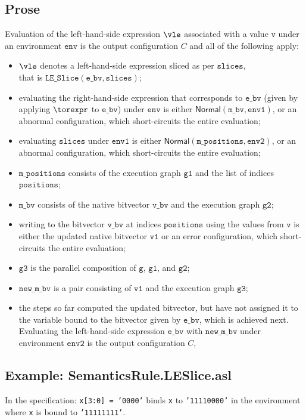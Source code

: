 \documentclass{book}
\newcommand\ProseOrAbnormal[0]{or an abnormal configuration, which short-circuits the entire evaluation}
\newcommand\ProseOrError[0]{or an error configuration, which short-circuits the entire evaluation}
\newcommand\Normal[0]{\textsf{Normal}}
\newcommand\env[0]{\texttt{env}}
\newcommand\envone[0]{\texttt{env1}}
\newcommand\envtwo[0]{\texttt{env2}}
\newcommand\vg[0]{\texttt{g}}
\newcommand\vv[0]{\texttt{v}}
\newcommand\vvone[0]{\texttt{v1}}
\newcommand\vgone[0]{\texttt{g1}}
\newcommand\vgtwo[0]{\texttt{g2}}
\newcommand\vgthree[0]{\texttt{g3}}
\newcommand\ebv[0]{\texttt{e\_bv}}
\newcommand\mbv[0]{\texttt{m\_bv}}
\newcommand\vbv[0]{\texttt{v\_bv}}
\newcommand\mpositions[0]{\texttt{m\_positions}}
\newcommand\slices[0]{\texttt{slices}}
\newcommand\positions[0]{\texttt{positions}}
\newcommand\newmbv[0]{\texttt{new\_m\_bv}}
\begin{document}
  \subsection{Prose}
  Evaluation of the left-hand-side expression $\vle$ associated with a
  value $\vv$ under an environment $\env$ is the output configuration $C$
  and all of the following apply:
  \begin{itemize}
    \item $\vle$ denotes a left-hand-side expression sliced as per $\slices$, \\
    that is $\texttt{LE\_Slice}(\ebv, \slices)$;
    \item evaluating the right-hand-side expression that corresponds to $\ebv$
    (given by applying $\torexpr$ to $\ebv$) under $\env$
      is either $\Normal(\mbv,\envone)$, \ProseOrAbnormal;
    \item evaluating $\slices$ under $\envone$ is either $\Normal(\mpositions, \envtwo)$,
    \ProseOrAbnormal;
    \item $\mpositions$ consists of the execution graph $\vgone$ and the list of indices $\positions$;
    \item $\mbv$ consists of the native bitvector $\vbv$ and the execution graph $\vgtwo$;
    \item writing to the bitvector $\vbv$ at indices $\positions$ using the values from $\vv$
    is either the updated native bitvector $\vvone$ \ProseOrError;
    \item $\vgthree$ is the parallel composition of $\vg$, $\vgone$, and $\vgtwo$;
    \item $\newmbv$ is a pair consisting of $\vvone$ and the execution graph $\vgthree$;
    \item the steps so far computed the updated bitvector, but have not assigned it to the
    variable bound to the bitvector given by $\ebv$, which is achieved next.
    Evaluating the left-hand-side expression $\ebv$ with
    $\newmbv$ under environment $\envtwo$ is the output configuration $C$,
  \end{itemize}

   \subsection{Example: SemanticsRule.LESlice.asl}
   In the specification:
   \texttt{x[3:0] = '0000'} binds \texttt{x} to \texttt{'11110000'} in the environment where \texttt{x} is bound to \texttt{'11111111'}.
\end{document}
